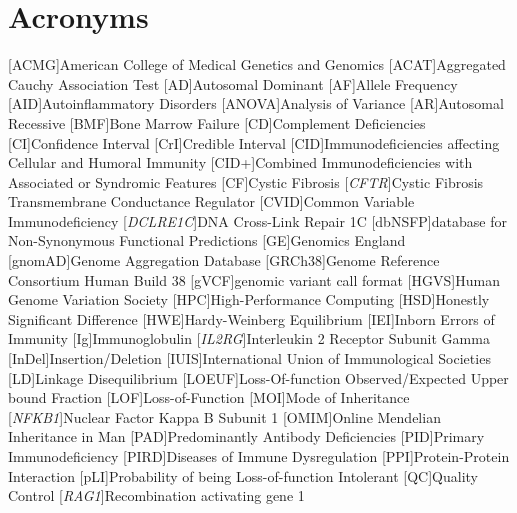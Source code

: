 \section*{Acronyms}
\renewenvironment{description}%
  {\list{}{\labelwidth0pt\itemindent-\leftmargin
    \parsep-1em\itemsep0pt\let\makelabel\descriptionlabel}}
  {\endlist}
\begin{acronym}
[ACMG]{American College of Medical Genetics and Genomics}%
[ACAT]{Aggregated Cauchy Association Test}%
[AD]{Autosomal Dominant}%
  [AF]{Allele Frequency}
 [AID]{Autoinflammatory Disorders}
 [ANOVA]{Analysis of Variance}
 [AR]{Autosomal Recessive}
 [BMF]{Bone Marrow Failure}
 [CD]{Complement Deficiencies}
 [CI]{Confidence Interval}
 [CrI]{Credible Interval}
 [CID]{Immunodeficiencies affecting Cellular and Humoral Immunity}
 [CID+]{Combined Immunodeficiencies with Associated or Syndromic Features}
 [CF]{Cystic Fibrosis}
 [\textit{CFTR}]{Cystic Fibrosis Transmembrane Conductance Regulator}
 [CVID]{Common Variable Immunodeficiency}
  [\textit{DCLRE1C}]{DNA Cross-Link Repair 1C}
 [dbNSFP]{database for Non-Synonymous Functional Predictions}
 [GE]{Genomics England} 
 [gnomAD]{Genome Aggregation Database}
 [GRCh38]{Genome Reference Consortium Human Build 38}
[gVCF]{genomic variant call format}
 [HGVS]{Human Genome Variation Society}
 [HPC]{High-Performance Computing}
 [HSD]{Honestly Significant Difference}
 [HWE]{Hardy-Weinberg Equilibrium}
 [IEI]{Inborn Errors of Immunity}
  [Ig]{Immunoglobulin}
 [\textit{IL2RG}]{Interleukin 2 Receptor Subunit Gamma}
 [InDel]{Insertion/Deletion}
 [IUIS]{International Union of Immunological Societies}
 [LD]{Linkage Disequilibrium}
 [LOEUF]{Loss-Of-function Observed/Expected Upper bound Fraction}
 [LOF]{Loss-of-Function}
 [MOI]{Mode of Inheritance}
 [\textit{NFKB1}]{Nuclear Factor Kappa B Subunit 1}
 [OMIM]{Online Mendelian Inheritance in Man}
 [PAD]{Predominantly Antibody Deficiencies}
 [PID]{Primary Immunodeficiency}
 [PIRD]{Diseases of Immune Dysregulation}
 [PPI]{Protein-Protein Interaction}
 [pLI]{Probability of being Loss-of-function Intolerant}
 [QC]{Quality Control}
 [\textit{RAG1}]{Recombination activating gene 1}

\end{acronym}
